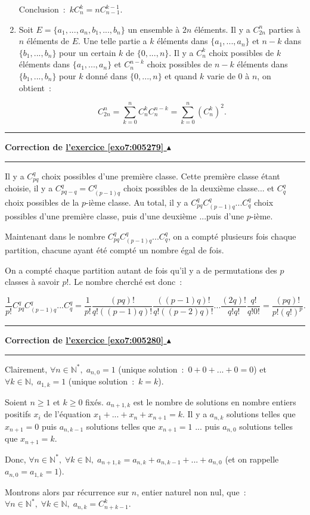 \documentclass[11pt,a4paper]{article}
\newcommand{\Nn}{\mathbb{N}} \newcommand{\N}{\mathbb{N}}
\newcounter{exo}
\newcommand{\correction}[1]{\hypertarget{cor7:#1}{}\label{cor7:#1}{\bf Correction de \hyperlink{exo7:#1}{l'exercice \ref{exo7:#1} $\blacktriangle$}}\vspace{1mm}\hrule\vspace{1mm}}
\newcommand{\fincorrection}{\vspace{1mm}\hrule\vspace*{7mm}}
\begin{document}
\begin{enumerate}
Conclusion~:~$kC_n^k=nC_{n-1}^{k-1}$. 

\item  Soit $E=\{a_1,...,a_n,b_1,...,b_n\}$ un ensemble à $2n$ éléments. Il y a $C_{2n}^n$ parties à $n$ éléments de $E$. Une telle partie a $k$ éléments dans $\{a_1,...,a_n\}$ et $n-k$ dans $\{b_1,...,b_n\}$ pour un certain $k$ de $\{0,...,n\}$. Il y a $C_n^k$ choix possibles de $k$ éléments dans $\{a_1,...,a_n\}$ et $C_n^{n-k}$ choix possibles de $n-k$ éléments dans $\{b_1,...,b_n\}$ pour $k$ donné dans $\{0,...,n\}$ et quand $k$ varie de $0$ à $n$, on obtient~:

$$C_{2n}^n=\sum_{k=0}^{n}C_n^kC_n^{n-k}=\sum_{k=0}^{n}(C_n^k)^2.$$

\end{enumerate}
\fincorrection
\correction{005279}
Il y a $C_{pq}^q$ choix possibles d'une première classe. Cette première classe étant choisie, il y a $C_{pq-q}^{q}=C_{(p-1)q}^q$ choix possibles de la deuxième classe... et $C_{q}^q$ choix possibles de la $p$-ième classe. Au total, il y a $C_{pq}^qC_{(p-1)q}^q...C_{q}^q$ choix possibles d'une première classe, puis d'une deuxième ...puis d'une $p$-ième.

Maintenant dans le nombre $C_{pq}^qC_{(p-1)q}^q...C_{q}^q$, on a compté plusieurs fois chaque partition, chacune ayant été compté un nombre égal de fois.

On a compté chaque partition autant de fois qu'il y a de permutations des $p$ classes à savoir $p!$. Le nombre cherché est donc~:  

$$\frac{1}{p!}C_{pq}^qC_{(p-1)q}^q...C_{q}^q=\frac{1}{p!}\frac{(pq)!}{q!((p-1)q)!}\frac{((p-1)q)!}{q!((p-2)q)!}...
\frac{(2q)!}{q!q!}\frac{q!}{q!0!}=\frac{(pq)!}{p!(q!)^p}.$$
\fincorrection
\correction{005280}
Clairement, $\forall n\in\Nn^*,\;a_{n,0}=1$ (unique solution~:~$0+0+...+0=0$) et $\forall k\in\Nn,\;a_{1,k}=1$ (unique solution~:~$k=k$).

Soient $n\geq 1$ et $k\geq 0$ fixés. $a_{n+1,k}$ est le nombre de solutions en nombre entiers positifs $x_i$ de l'équation $x_1+...+x_n+x_{n+1}=k$.
Il y a $a_{n,k}$ solutions telles que $x_{n+1}=0$ puis $a_{n,k-1}$ solutions telles que $x_{n+1}=1$ ... puis $a_{n,0}$ solutions telles que $x_{n+1}=k$.

Donc, $\forall n\in\Nn^*,\;\forall k\in\Nn,\;a_{n+1,k}=a_{n,k}+a_{n,k-1}+...+a_{n,0}$ (et on rappelle $a_{n,0}=a_{1,k}=1$).

Montrons alors par récurrence sur $n$, entier naturel non nul, que~:~$\forall n\in\Nn^*,\;\forall k\in\Nn,\;a_{n,k}=C_{n+k-1}^k$.
 
\end{document}
